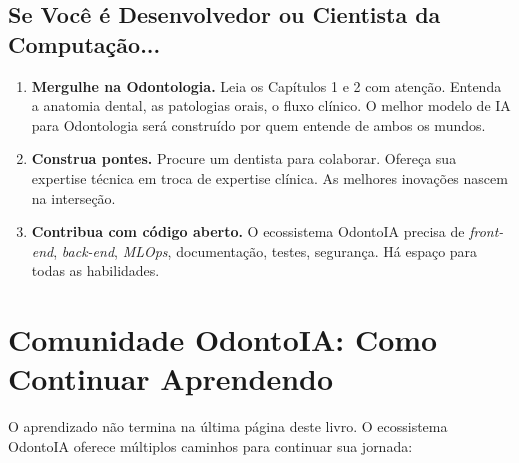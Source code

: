 \subsection{Se Você é Desenvolvedor ou Cientista da Computação...}

\begin{enumerate}
  \item \textbf{Mergulhe na Odontologia.} Leia os Capítulos 1 e 2 com atenção.
    Entenda a anatomia dental, as patologias orais, o fluxo clínico. O melhor
    modelo de IA para Odontologia será construído por quem entende de ambos os
    mundos.

  \item \textbf{Construa pontes.} Procure um dentista para colaborar. Ofereça
    sua expertise técnica em troca de expertise clínica. As melhores inovações
    nascem na interseção.

  \item \textbf{Contribua com código aberto.} O ecossistema OdontoIA precisa
    de \textit{front-end}, \textit{back-end}, \textit{MLOps}, documentação,
    testes, segurança. Há espaço para todas as habilidades.
\end{enumerate}

\section{Comunidade OdontoIA: Como Continuar Aprendendo}
\label{sec:comunidade}

\nivelzero

O aprendizado não termina na última página deste livro. O ecossistema OdontoIA
oferece múltiplos caminhos para continuar sua jornada:

